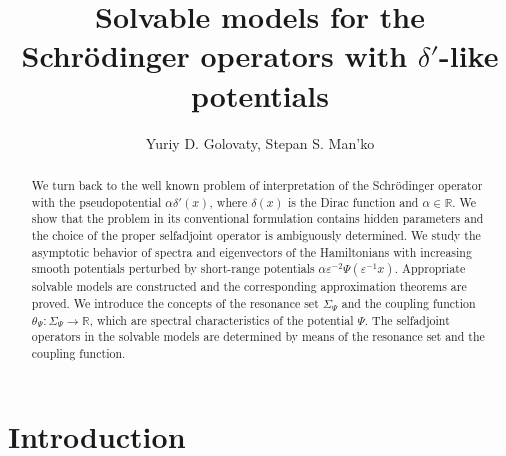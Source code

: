 \documentclass[11pt,english]{amsart}
\begin{document}
\theoremstyle{plain}
\newtheorem{g_theorem}{Theorem}[section]
\newtheorem{g_lemma}{Lemma}[section]
\newtheorem{g_definition}{Definition}[section]
\newtheorem{g_corollary}{Corollary}[section]
\newtheorem*{g_hyp}{Hypothesis}

\theoremstyle{definition}
\newtheorem{g_remark}{Remark}[section]


\title[Solvable models for the Schr\"{o}dinger operators]
{Solvable models for the Schr\"{o}dinger operators with $\delta'$-like potentials}

\author{Yuriy D. Golovaty, Stepan S. Man'ko}\address{ Department of Mechanics and Mathematics, Ivan Franko National University of L'viv, 1 Universytetska str., 79000 L'viv, Ukraine }

\begin{abstract}
We turn back to the well known problem of interpretation of the Schr\"{o}dinger operator with the pseudopotential $\alpha\delta'(x)$, where $\delta(x)$ is the Dirac function and $\alpha\in \mathbb{R}$. We show that the problem in its conventional formulation contains  hidden parameters and  the choice of the proper selfadjoint operator is ambiguously determined.
We study the asymptotic behavior of spectra and eigenvectors of the Hamiltonians with increa\-sing smooth potentials  perturbed by  short-range potentials  $\alpha\varepsilon^{-2}\Psi(\varepsilon^{-1}x)$. Appropriate solvable models  are constructed and the corresponding approximation theorems are proved.
We introduce the concepts of the resonance set $\Sigma_\Psi$ and the coupling function
$\theta_\Psi \colon\Sigma_\Psi \to \mathbb{R}$,
which are spectral characteristics of  the potential
$\Psi$. The selfadjoint operators in the solvable models are determined by means of the resonance set  and the coupling function.
\end{abstract}



\maketitle

\section*{Introduction}
\end{document}
